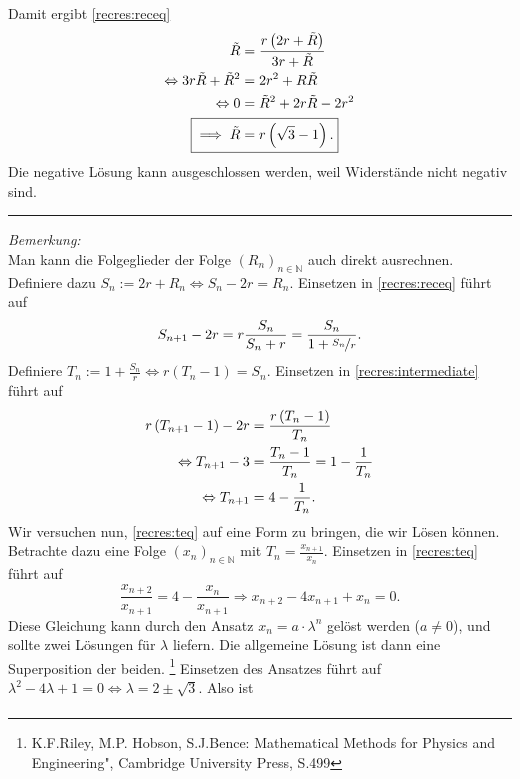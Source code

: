 \documentclass[a4paper]{article}
\numberwithin{equation}{Exercise}
\numberwithin{figure}{Exercise}
\begin{document}
\begin{Answer}[ref = recres]
	Damit ergibt \eqref{recres:receq}
	\begin{align*}
	\tilde{R}  &= \frac{r\left(2r+\tilde{R}\right)}{3r+\tilde{R}}\\
	\Leftrightarrow 3r\tilde{R} + \tilde{R}^2 &= 2r^2 + R\tilde{R}\\
	\Leftrightarrow 0&=\tilde{R}^2 + 2r\tilde{R} - 2r^2 \\
	\Aboxed{\implies \tilde{R} &= r\left(\sqrt{3}-1\right).}
	\end{align*}
	Die negative Lösung kann ausgeschlossen werden, weil Widerstände nicht negativ sind.\\
	\noindent\rule{\textwidth}{.75pt}
	\textit{Bemerkung:} \\
	Man kann die Folgeglieder der Folge $(R_n)_{n\in \mathbb{N}}$ auch direkt ausrechnen.
	Definiere dazu $S_n := 2r + R_n \Leftrightarrow S_n - 2r = R_n$. Einsetzen in \eqref{recres:receq} führt auf 
	\begin{equation}\label{recres:intermediate}
	S_{n+1} - 2r = r\frac{S_n}{S_n+r} = \frac{S_n}{1+\nicefrac{S_n}{r}}.
	\end{equation}
	Definiere $T_n := 1+\frac{S_n}{r} \Leftrightarrow r\left(T_n-1\right) = S_n$. Einsetzen in \eqref{recres:intermediate} führt auf 
	\begin{align}\label{recres:teq}
	r\left(T_{n+1}-1\right) - 2r &= \frac{r\left(T_n-1\right)}{T_n}\notag\\
	\Leftrightarrow T_{n+1}-3 &= \frac{T_n-1}{T_n} = 1 -\frac{1}{T_n}\notag\\
	\Leftrightarrow T_{n+1} &= 4 - \frac{1}{T_n}.
	\end{align}
	Wir versuchen nun, \eqref{recres:teq} auf eine Form zu bringen, die wir Lösen können. Betrachte dazu eine Folge $\left(x_n\right)_{n\in \mathbb{N}}$ mit $T_n = \frac{x_{n+1}}{x_n}$. Einsetzen in \eqref{recres:teq} führt auf 
	\begin{equation}
	\frac{x_{n+2}}{x_{n+1}} = 4 - \frac{x_n}{x_{n+1}} \Rightarrow x_{n+2} - 4x_{n+1} + x_{n} = 0.
	\end{equation}
	Diese Gleichung kann durch den Ansatz $x_n = a\cdot \lambda^n$ gelöst werden ($a\neq 0$), und sollte zwei Lösungen für $\lambda$ liefern. Die allgemeine Lösung ist dann eine Superposition der beiden. \footnote[3]{K.F.Riley, M.P. Hobson, S.J.Bence: \glqq Mathematical Methods for Physics and Engineering", Cambridge University Press, S.499}
	Einsetzen des Ansatzes führt auf $\lambda^2 - 4 \lambda + 1 = 0 \Leftrightarrow \lambda = 2\pm \sqrt{3}$. Also ist 
	\begin{align*}

\end{align*}
\end{Answer}
\end{document}
